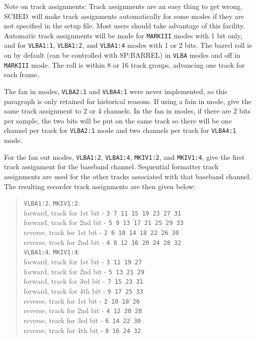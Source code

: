 \documentclass{report}
\newcommand{\schedb}{{\sc SCHED~}}
\begin{document}
Note on track assignments: Track assignments are an easy thing to get
wrong. \schedb will make track assignments automatically for some
modes if they are not specified in the setup file.  Most users should
take advantage of this facility. Automatic track assignments will be
made for {\tt MARKIII} modes with 1 bit only, and for {\tt VLBA1:1},
{\tt VLBA1:2}, and {\tt VLBA1:4} modes with 1 or 2 bits. The barrel
roll is on by default (can be controlled with 
{SP:BARREL}) in {\tt VLBA} modes and off in {\tt MARKIII} mode. The
roll is within 8 or 16 track groups, advancing one track for each
frame.

The fan in modes, {\tt VLBA2:1} and {\tt VLBA4:1} were never implemented,
so this paragraph is only retained for historical reasons.
If using a fain in mode, give the same track
assignment to 2 or 4 channels.  In the fan in modes, if there are 2
bits per sample, the two bits will be put on the same track so there
will be one channel per track for {\tt VLBA2:1} mode and two channels
per track for {\tt VLBA4:1} mode.

For the fan out modes, {\tt VLBA1:2}, {\tt VLBA1:4}, {\tt MKIV1:2}, and
{\tt MKIV1:4}, give the first track assignment for the baseband
channel. Sequential formatter track assignments are used for the other
tracks associated with that baseband channel. The resulting recorder
track assignments are then given below:
\begin{verse}
{\tt VLBA1:2}, {\tt MKIV1:2}: \\
forward, track for 1st bit - {\tt 3 7 11 15 19 23 27 31} \\
forward, track for 2nd bit - {\tt 5 9 13 17 21 25 29 33} \\
reverse, track for 1st bit - {\tt 2 6 10 14 18 22 26 30} \\
reverse, track for 2nd bit - {\tt 4 8 12 16 20 24 28 32} \\
{\tt VLBA1:4}, {\tt MKIV1:4}: \\
forward, track for 1st bit - {\tt 3 11 19 27} \\
forward, track for 2nd bit - {\tt 5 13 21 29} \\
forward, track for 3rd bit - {\tt 7 15 23 31} \\
forward, track for 4th bit - {\tt 9 17 25 33} \\
reverse, track for 1st bit - {\tt 2 10 18 26} \\
reverse, track for 2nd bit - {\tt 4 12 20 28} \\
reverse, track for 3rd bit - {\tt 6 14 22 30} \\
reverse, track for 4th bit - {\tt 8 16 24 32} \\
\end{verse}
\end{document}
